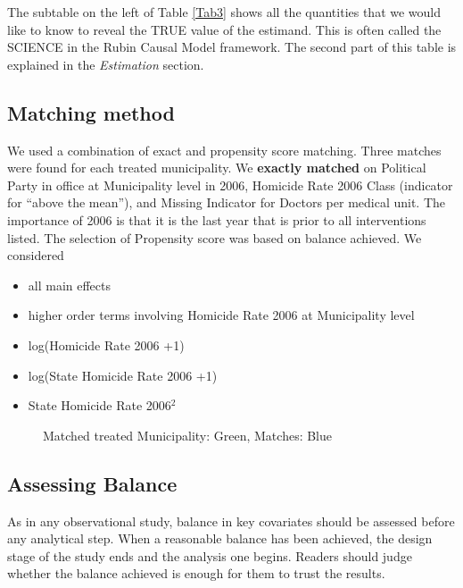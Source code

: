 \documentclass{article}[11 pt]
\begin{document}
The subtable on the left of Table \ref{Tab3} shows all the quantities that we would like to know to reveal the TRUE value of the estimand. This is often called the SCIENCE in the Rubin Causal Model framework. The second part of this table is explained in the \emph{Estimation} section.					

\subsection{Matching method}
We used a combination of exact and propensity score matching. Three matches were found for each treated municipality. We \textbf{exactly matched} on Political Party in office at Municipality level in 2006, Homicide Rate 2006 Class (indicator for ``above the mean''), and Missing Indicator for Doctors per medical unit. The importance of 2006 is that it is the last year that is prior to all interventions listed. The selection of Propensity score was based on balance achieved. We considered
\begin{itemize}
	 \item all main effects
	\item higher order terms involving Homicide Rate 2006 at Municipality level
	\item log(Homicide Rate 2006 +1)
	\item log(State Homicide Rate 2006 +1)
	\item State Homicide Rate 2006$^2$
\end{itemize}

 

\begin{figure}[htdp]
    \centering
{}
	\hspace{2cm}
\caption{Matched treated Municipality: Green, Matches: Blue}	
\end{figure}	


\subsection{Assessing Balance}
As in any observational study, balance in key covariates should be assessed before any analytical step. When a reasonable balance has been achieved, the design stage of the study ends and the analysis one begins. Readers should judge whether the balance achieved is enough for them to trust the results.  
\end{document}
